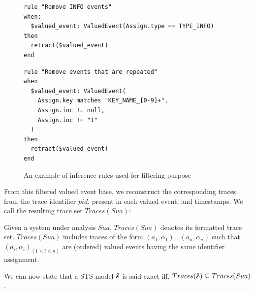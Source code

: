 \begin{figure}[ht]
\begin{framed}
\begin{BVerbatim}
rule "Remove INFO events"
when:
  $valued_event: ValuedEvent(Assign.type == TYPE_INFO)
then
  retract($valued_event)
end
\end{BVerbatim}
\end{framed}

\begin{framed}
\begin{BVerbatim}
rule "Remove events that are repeated"
when
  $valued_event: ValuedEvent(
    Assign.key matches "KEY_NAME_[0-9]+",
    Assign.inc != null,
    Assign.inc != "1"
  )
then
  retract($valued_event)
end
\end{BVerbatim}
\end{framed}

\caption{An example of inference rules used for filtering purpose}
\label{fig:removalrules}
\end{figure}

From this filtered valued event base, we reconstruct the
corresponding traces from the trace identifier $pid$, present in
each valued event, and timestamps. We call the resulting trace
set $Traces(Sua)$:

\begin{definition}
    Given a system under analysis $Sua$, $Traces(Sua)$ denotes
    its formatted trace set. $Traces(Sua)$ includes traces of the
    form $(a_1,\alpha_1) \dots (a_n,\alpha_n)$ such that
    $(a_i,\alpha_i)_{(1 \leq i \leq n)}$ are (ordered) valued
    events having the same identifier assignment.

	\label{def:structuredtrace}
\end{definition}

We can now state that a STS model $\EuScript{S}$ is said exact
iff. $Traces(\EuScript{S}) \subseteq Traces(Sua)$.

